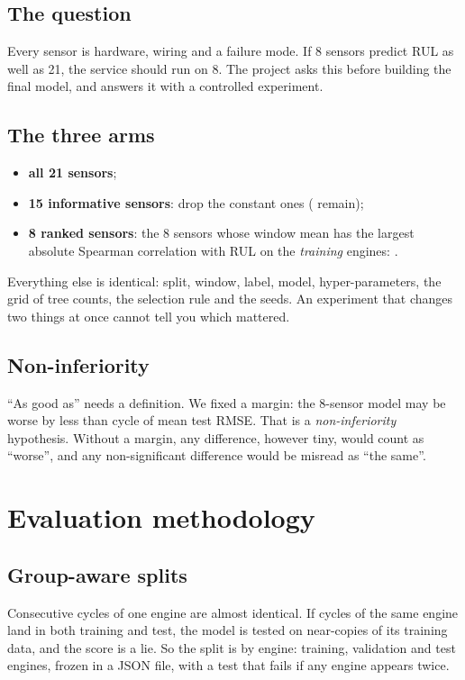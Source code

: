 \documentclass[11pt,a4paper]{article}
\begin{document}
\subsection{The question}
Every sensor is hardware, wiring and a failure mode. If 8 sensors predict RUL as well as 21, the service should
run on 8. The project asks this before building the final model, and answers it with a controlled experiment.

\subsection{The three arms}
\begin{itemize}
\item \textbf{all 21 sensors};
\item \textbf{15 informative sensors}: drop the constant ones (\InformativeSensors{} remain);
\item \textbf{8 ranked sensors}: the 8 sensors whose window mean has the largest absolute Spearman correlation with
RUL on the \emph{training} engines: \ReducedEightSensors{}.
\end{itemize}
Everything else is identical: split, window, label, model, hyper-parameters, the grid of tree counts, the
selection rule and the seeds. An experiment that changes two things at once cannot tell you which mattered.

\subsection{Non-inferiority}
``As good as'' needs a definition. We fixed a margin: the 8-sensor model may be worse by less than \Margin{}
cycle of mean test RMSE. That is a \emph{non-inferiority} hypothesis. Without a margin, any difference, however
tiny, would count as ``worse'', and any non-significant difference would be misread as ``the same''.

\section{Evaluation methodology}

\subsection{Group-aware splits}
Consecutive cycles of one engine are almost identical. If cycles of the same engine land in both training and
test, the model is tested on near-copies of its training data, and the score is a lie. So the split is by
engine: \SplitTrain{} training, \SplitVal{} validation and \SplitTest{} test engines, frozen in a JSON file, with a
test that fails if any engine appears twice.
\end{document}
